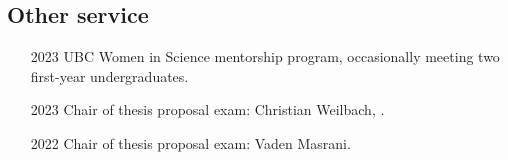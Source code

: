 \documentclass[10pt]{article}
\begin{document}
\subsection{Other service} %

\begin{itemize}[leftmargin=5em]
  \item[2023] {UBC Women in Science mentorship program}, occasionally meeting two first-year undergraduates.
  \item[2023] Chair of thesis proposal exam: Christian Weilbach, .
  \item[2022] Chair of thesis proposal exam: Vaden Masrani.
\end{itemize}





\end{document}
